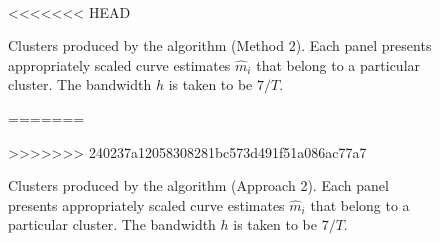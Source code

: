 \documentclass[a4paper,12pt]{article}
\numberwithin{equation}{section}
\begin{document}
\begin{figure}
\\
\hspace{0.25cm}
<<<<<<< HEAD
\caption{Clusters produced by the algorithm (Method 2). Each panel presents appropriately scaled curve estimates $\hat{m}_i$ that belong to a particular cluster. The bandwidth $h$ is taken to be $7/T$.}\label{fig:clusters_alt_14days}
=======
\caption{Clusters produced by the algorithm (Approach 2). Each panel presents appropriately scaled curve estimates $\hat{m}_i$ that belong to a particular cluster. The bandwidth $h$ is taken to be $7/T$.}\label{fig:clusters_alt_14days}
>>>>>>> 240237a12058308281bc573d491f51a086ac77a7
\end{figure}

\clearpage

{\small
\setlength{\bibsep}{0.35em}
}
\end{document}
